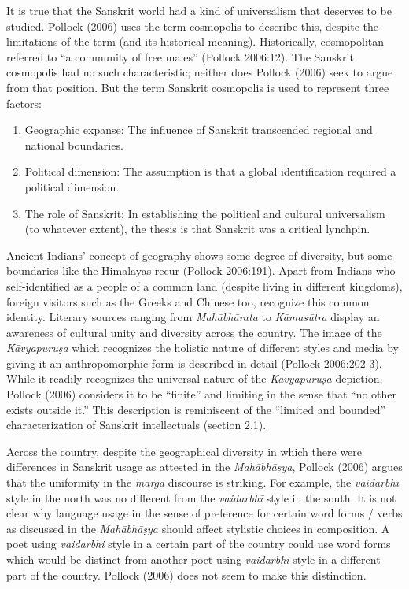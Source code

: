 It is true that the Sanskrit world had a kind of universalism that deserves to be studied. Pollock (2006) uses the term cosmopolis to describe this, despite the limitations of the term (and its historical meaning). Historically, cosmopolitan referred to “a community of free males” (Pollock 2006:12). The Sanskrit cosmopolis had no such characteristic; neither does Pollock (2006) seek to argue from that position. But the term Sanskrit cosmopolis is used to represent three factors: 
\begin{enumerate}
\itemsep=0pt
\item Geographic expanse: The influence of Sanskrit transcended regional and national boundaries.
\item Political dimension: The assumption is that a global identification required a political dimension. 
\item The role of Sanskrit: In establishing the political and cultural universalism (to whatever extent), the thesis is that Sanskrit was a critical lynchpin.
\end{enumerate}
Ancient Indians’ concept of geography shows some degree of diversity, but some boundaries like the Himalayas recur (Pollock 2006:191). Apart from Indians who self-identified as a people of a common land (despite living in different kingdoms), foreign visitors such as the Greeks and Chinese too, recognize this common identity. Literary sources ranging from {\sl Mahābhārata} to {\sl Kāmasūtra} display an awareness of cultural unity and diversity across the country. The image of the {\sl Kāvyapuruṣa} which recognizes the holistic nature of different styles and media by giving it an anthropomorphic form is described in detail (Pollock 2006:202-3). While it readily recognizes the universal nature of the {\sl Kāvyapuruṣa} depiction, Pollock (2006) considers it to be “finite” and limiting in the sense that “no other exists outside it.” This description is reminiscent of the “limited and bounded” characterization of Sanskrit intellectuals (section 2.1).

Across the country, despite the geographical diversity in which there were differences in Sanskrit usage as attested in the {\sl Mahābhāṣya}, Pollock (2006) argues that the uniformity in the {\sl mārga} discourse is striking. For example, the {\sl vaidarbhī} style in the north was no different from the {\sl vaidarbhī} style in the south. It is not clear why language usage in the sense of preference for certain word forms / verbs as discussed in the {\sl Mahābhāṣya} should affect stylistic choices in composition. A poet using {\sl vaidarbhi} style in a certain part of the country could use word forms which would be distinct from another poet using {\sl vaidarbhi} style in a different part of the country. Pollock (2006) does not seem to make this distinction.

